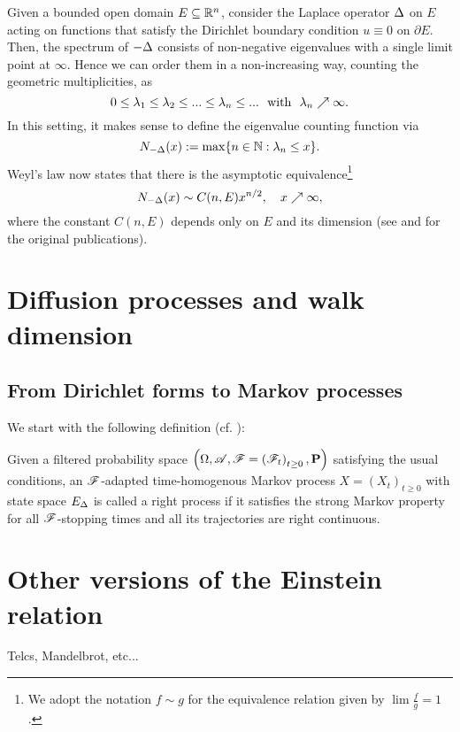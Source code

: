 Given a bounded open domain $E\subseteq\mathbb{R}^n$, consider the Laplace operator $\Delta$ on $E$ acting on functions that satisfy the Dirichlet boundary condition $u\equiv0$ on $\partial E$. Then, the spectrum of $-\Delta$ consists of non-negative eigenvalues with a single limit point at $\infty$. Hence we can order them in a non-increasing way, counting the geometric multiplicities, as
\[
  0\leq\gl_1\leq\gl_2\leq...\leq\gl_n\leq...\ \text{ with }\ \gl_n\nearrow\infty. 
\]
In this setting, it makes sense to define the eigenvalue counting function via 
\begin{equation}\label{eq:DECF}
  N_{-\Delta}(x):=\max\{n\in\mathbb{N}:\lambda_n\leq x\}.
\end{equation}
Weyl's law now states that there is the asymptotic equivalence\footnote{We adopt the notation $f\sim g$ for the equivalence relation given by $\lim\frac{f}{g}=1$.}
\begin{equation}\label{eq:WL}
  N_{-\Delta}(x)\sim C(n,E)x^{n/2},\quad x\nearrow\infty,
\end{equation}
where the constant $C(n,E)$ depends only on $E$ and its dimension (see \cite{Weyl1911} and \cite{Weyl1912} for the original publications).



\newpage

\section{Diffusion processes and walk dimension}

\subsection{From Dirichlet forms to Markov processes}

We start with the following definition (cf. \cite[Def. IV.1.13]{ma2012introduction}):
\begin{defin}
  Given a filtered probability space $\left(\Omega,\mathscr{A},\mathscr{F}=\left(\mathscr{F}_t\right)_{t\geq0},\mathbf{P}\right)$ satisfying the usual conditions, an $\mathscr{F}$-adapted time-homogenous Markov process $X=(X_t)_{t\geq0}$ with state space $E_\Delta$ is called a right process if it satisfies the strong Markov property for all $\mathscr{F}$-stopping times and all its trajectories are right continuous.  
\end{defin}

\section{Other versions of the Einstein relation}

Telcs, Mandelbrot, etc...

